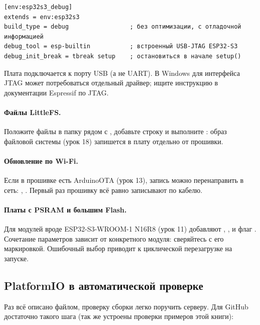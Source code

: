 \begin{Verbatim}[fontsize=\small,bgcolor=codebg]
[env:esp32s3_debug]
extends = env:esp32s3
build_type = debug                 ; без оптимизации, с отладочной информацией
debug_tool = esp-builtin           ; встроенный USB-JTAG ESP32-S3
debug_init_break = tbreak setup    ; остановиться в начале setup()
\end{Verbatim}

Плата подключается к порту USB (а не UART). В Windows для интерфейса JTAG может потребоваться
отдельный драйвер; ищите инструкцию в документации Espressif по JTAG.

\paragraph{Файлы LittleFS.} Положите файлы в папку  рядом с ,
добавьте строку  и выполните
: образ файловой системы (урок 18) запишется в плату отдельно от прошивки.

\paragraph{Обновление по Wi-Fi.} Если в прошивке есть ArduinoOTA (урок 13), запись можно
перенаправить в сеть: , .
Первый раз прошивку всё равно записывают по кабелю.

\paragraph{Платы с PSRAM и большим Flash.} Для модулей вроде ESP32-S3-WROOM-1 N16R8 (урок 11)
добавляют ,
,  и
флаг . Сочетание параметров зависит от конкретного модуля: сверяйтесь
с его маркировкой. Ошибочный выбор приводит к циклической перезагрузке на запуске.

\subsection{PlatformIO в автоматической проверке}

Раз всё описано файлом, проверку сборки легко поручить серверу. Для GitHub достаточно
такого шага (так же устроены проверки примеров этой книги):

